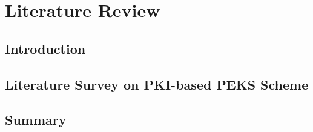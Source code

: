 %
\chapter[Literature Review]{Literature Review}
\label{chp2}
\section{Introduction}

\section{Literature Survey on PKI-based PEKS Scheme}


\section{Summary}
